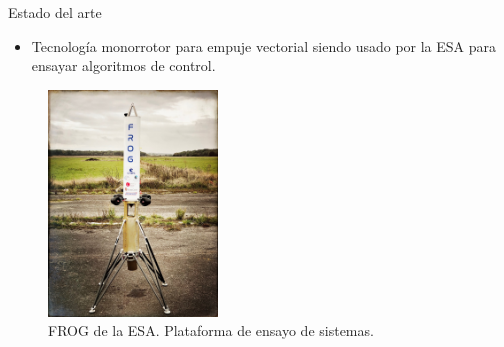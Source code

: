 \documentclass[10pt]{beamer}
\begin{document}
\begin{frame}{Estado del arte}
    \begin{itemize}
        \item Tecnología monorrotor para empuje vectorial siendo usado por la ESA para ensayar algoritmos de control.
    \end{itemize}

    \begin{figure}[htb]
        \centering
        \includegraphics[height=6cm]{fig/frog_esa.jpg}
        \caption{FROG de la ESA. Plataforma de ensayo de sistemas.}
        \label{fig:frog_esa}
    \end{figure}
\end{frame}
\end{document}
